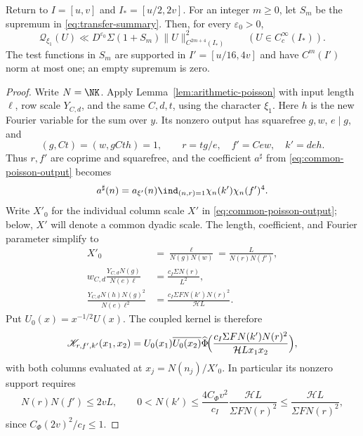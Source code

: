 \begin{lemma}\label{lem:second-transfer}
Return to $I=[u,v]$ and $I_*=[u/2,2v]$. For an integer $m\ge0$,
let $S_m$ be the supremum in \eqref{eq:transfer-summary}.
Then, for every $\varepsilon_0>0$,
\[
 \mathcal Q_{\xi_1}(U)\ll D^{\varepsilon_0}\Sigma(1+S_m)
       \|U\|_{C^{2m+4}(I_*)}^2
 \qquad(U\in C_c^\infty(I_*)).
\]
The test functions in $S_m$ are supported in $I'=[u/16,4v]$ and have $C^m(I')$ norm at most one; an empty supremum is zero.
\end{lemma}
\begin{proof}
Write $N=\NK$.
Apply Lemma~\ref{lem:arithmetic-poisson} with input length $\ell$,
row scale $Y_{C,d}$, and the same $C,d,t$, using the character $\xi_1$.
Here $h$ is the new Fourier variable for the sum over $y$.
Its nonzero output has squarefree $g,w$, $e\mid g$, and
\[
 (g,Ct)=(w,gCth)=1,\qquad
 r=tg/e,\quad f'=Cew,\quad k'=deh.
\]
Thus $r,f'$ are coprime and squarefree, and the coefficient $a^\sharp$ from \eqref{eq:common-poisson-output} becomes
\[
 a^\sharp(n)
 =a_{\xi'}(n)\ind_{(n,r)=1}\chi_n(k')\chi_n(f')^4.
\]
Write $X'_0$ for the individual column scale $X'$ in
\eqref{eq:common-poisson-output}; below, $X'$ will denote a common
dyadic scale. The length, coefficient, and Fourier parameter simplify to
\[
 \begin{aligned}
 X'_0&=\frac{\ell}{N(g)N(w)}=\frac L{N(r)N(f')},\\
 w_{C,d}\frac{Y_{C,d}N(g)}{N(e)\ell}
 &=\frac{c_I\Sigma N(r)}{L^2},\\
 \frac{Y_{C,d}N(h)N(g)^2}{N(e)\ell^2}
 &=\frac{c_I\Sigma F N(k')N(r)^2}{\mathcal H L}.
 \end{aligned}
\]
Put $U_0(x)=x^{-1/2}U(x)$. The coupled kernel is therefore
\[
 \mathscr K_{r,f',k'}(x_1,x_2)
 =U_0(x_1)\overline{U_0(x_2)}
       \widehat\Phi\!\Bigl(\frac{c_I\Sigma F N(k')N(r)^2}{\mathcal H Lx_1x_2}\Bigr),
\]
with both columns evaluated at $x_j=N(n_j)/X'_0$.
In particular its nonzero support requires
\[
 N(r)N(f')\le 2vL,\qquad
 0<N(k')\le\frac{4C_\Phi v^2}{c_I}
              \frac{\mathcal H L}{\Sigma F N(r)^2}
          \le\frac{\mathcal H L}{\Sigma F N(r)^2},
\]
since $C_\Phi(2v)^2/c_I\le1$.


\end{proof}

